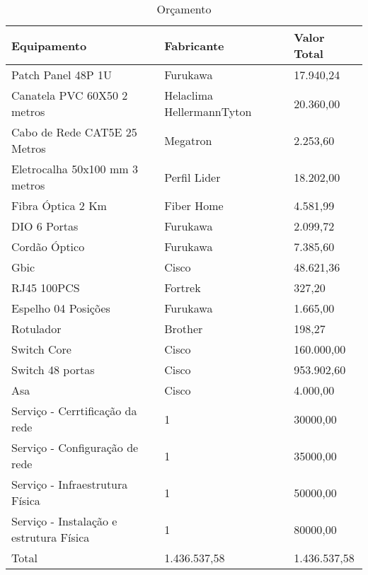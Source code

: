 \begin{table}[h!] %
\centering
\caption{Orçamento}
\label{tab8} %
\begin{tabular}{|l|l|l|}
\hline
Equipamento                             & Fabricante                & Valor Total  \\ \hline
Patch Panel 48P 1U                      & Furukawa                  & 17.940,24    \\ \hline
Canatela PVC 60X50 2 metros             & Helaclima HellermannTyton & 20.360,00    \\ \hline
Cabo de Rede CAT5E 25 Metros            & Megatron                  & 2.253,60     \\ \hline
Eletrocalha 50x100 mm 3 metros          & Perfil Lider              & 18.202,00    \\ \hline
Fibra Óptica 2 Km                       & Fiber Home                & 4.581,99     \\ \hline
DIO 6 Portas                            & Furukawa                  & 2.099,72     \\ \hline
Cordão Óptico                           & Furukawa                  & 7.385,60     \\ \hline
Gbic                                    & Cisco                     & 48.621,36    \\ \hline
RJ45 100PCS                             & Fortrek                   & 327,20       \\ \hline
Espelho 04 Posições                     & Furukawa                  & 1.665,00     \\ \hline
Rotulador                               & Brother                   & 198,27       \\ \hline
Switch Core                             & Cisco                     & 160.000,00   \\ \hline
Switch 48 portas                        & Cisco                     & 953.902,60   \\ \hline
Asa                                     & Cisco                     & 4.000,00     \\ \hline
Serviço - Cerrtificação da rede         & 1                         & 30000,00     \\ \hline
Serviço - Configuração de rede          & 1                         & 35000,00     \\ \hline
Serviço - Infraestrutura Física         & 1                         & 50000,00     \\ \hline
Serviço - Instalação e estrutura Física & 1                         & 80000,00     \\ \hline
Total                                   & 1.436.537,58              & 1.436.537,58 \\ \hline
\end{tabular}
\end{table}